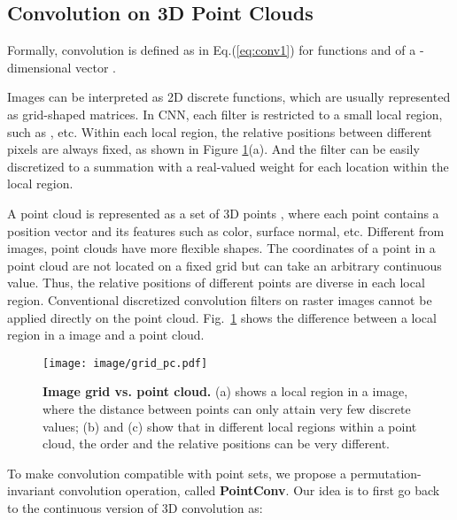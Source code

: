\documentclass[10pt,twocolumn,letterpaper]{article}
\begin{document}
\subsection{Convolution on 3D Point Clouds} \label{DDC}

Formally, convolution is defined as in Eq.(\ref{eq:conv1}) for functions  and  of a -dimensional vector .

\vspace{-0.2in}

\vskip -0.05in

Images can be interpreted as 2D discrete functions, which are usually represented as grid-shaped matrices. In CNN, each filter is restricted to a small local region, such as , etc. Within each local region, the relative positions between different pixels are always fixed, as shown in Figure \ref{fig1}(a). And the filter can be easily discretized to a summation with a real-valued weight for each location within the local region. 

A point cloud is represented as a set of 3D points , where each point contains a position vector  and its features such as color,  surface normal, etc. Different from images, point clouds have more flexible shapes. The coordinates  of a point in a point cloud are not located on a fixed grid but can take an arbitrary continuous value. Thus, the relative positions of different points are diverse in each local region. Conventional discretized convolution filters on raster images cannot be applied directly on the point cloud. Fig.~\ref{fig1} shows the difference between a local region in a image and a point cloud.

\begin{figure}
	\centering
	\texttt{[image: image/grid\_pc.pdf]}
	\caption{\textbf{Image grid vs. point cloud.} (a) shows a  local region in a image, where the distance between points can only attain very few discrete values; (b) and (c) show that in different local regions within a point cloud, the order and the relative positions can be very different.}
	\label{fig1}
\vspace{-0.1in}
\end{figure}

To make convolution compatible with point sets, we propose a permutation-invariant convolution operation, called \textbf{PointConv}. Our idea is to first go back to the continuous version of 3D convolution as:

\vspace{-0.2in}
\begin{small}
    
\end{small}
\vskip -0.2in
\end{document}
